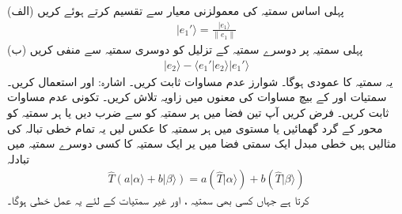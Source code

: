 (الف) پہلی اساس سمتیہ کی معمولزنی معیار سے تقسیم کرتے ہوئے کریں
\begin{align*}
		|e_1'\rangle = \frac{|e_1\rangle}{\|e_1\|}
\end{align*}
(ب) پہلی سمتیہ پر دوسرے سمتیہ کے تزلیل کو دوسری سمتیہ سے منفی کریں
\begin{align*}
	|e_2\rangle-\langle e_1'|e_2\rangle|e_1'\rangle
\end{align*}
یہ سمتیہ  کا عمودی ہوگا۔
شوارز عدم مساوات ثابت کریں۔ اشارہ:  اور  استعمال کریں۔
سمتیات  اور  کے بیچ مساوات  کی معنوں میں زاویہ تلاش کریں۔
تکونی عدم مساوات  ثابت کریں۔
فرض کریں آپ تین فضا میں ہر سمتیہ کو  سے ضرب دیں یا ہر سمتیہ کو  محور کے گرد  گھمائیں یا  مستوی میں ہر سمتیہ کا عکس لیں یہ تمام خطی تبالہ کی مثالیں ہیں خطی مبدل  ایک سمتی فضا میں یر ایک سمتیہ کا کسی دوسرے سمتیہ  میں تبادلہ
\begin{align}
	\hat{T}(a|\alpha\rangle+b|\beta\rangle)=a(\hat{T}|\alpha\rangle)+b(\hat{T}|\beta\rangle)
\end{align}
کرتا ہے جہاں کسی بھی سمتیہ ،  اور غیر سمتیات  کے لئے یہ عمل خطی ہوگا۔

